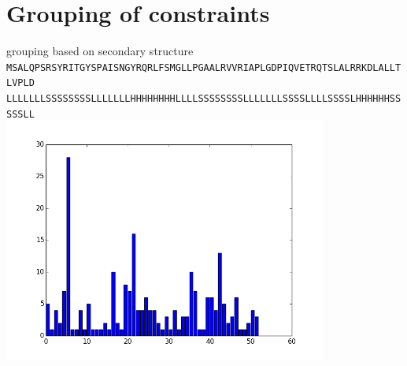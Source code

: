 \documentclass{beamer}
\begin{document}
\section{Grouping of constraints}
\frame{\tableofcontents[currentsection]}


\begin{frame}{grouping based on secondary structure}
    \centering
    \tiny
    \texttt{
MSALQPSRSYRITGYSPAISNGYRQRLFSMGLLPGAALRVVRIAPLGDPIQVETRQTSLALRRKDLALLTLVPLD\\
LLLLLLLSSSSSSSSLLLLLLLHHHHHHHHLLLLSSSSSSSSLLLLLLLSSSSLLLLSSSSLHHHHHHSSSSSLL\\}
    \normalsize
    \vspace{.5cm}
    \includegraphics[width=0.8\textwidth]{img/contactMapGroupAmounts}
\end{frame}
\end{document}
